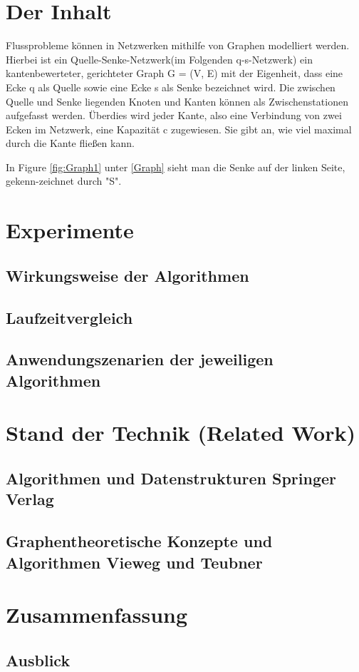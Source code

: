 \documentclass[11pt]{llncs}
\begin{document}
\section{Der Inhalt}
\label{Inhalt}

Flussprobleme k\"onnen in Netzwerken mithilfe von Graphen modelliert werden. Hierbei ist ein Quelle-Senke-Netzwerk(im Folgenden q-s-Netzwerk) ein kantenbewerteter, gerichteter Graph G = (V, E) mit der Eigenheit, dass eine Ecke q als Quelle sowie eine Ecke s als Senke bezeichnet wird. Die zwischen Quelle und Senke liegenden Knoten und Kanten können als Zwischenstationen aufgefasst werden. \"Uberdies wird jeder Kante, also eine Verbindung von zwei Ecken im Netzwerk, eine Kapazität c zugewiesen. Sie gibt an, wie viel maximal durch die Kante fließen kann. \citep{Testref}

In Figure \ref{fig:Graph1} unter \ref{Graph} sieht man die Senke auf der linken Seite, gekenn-zeichnet durch "S". 



\section{Experimente}
\label{Experimente}

\subsection{Wirkungsweise der Algorithmen}

\subsection{Laufzeitvergleich}

\subsection{Anwendungszenarien der jeweiligen Algorithmen}

\section{Stand der Technik (Related Work)}
\label{Related Work}
\subsection{Algorithmen und Datenstrukturen Springer Verlag}
\subsection{Graphentheoretische Konzepte und Algorithmen Vieweg und Teubner}

\section{Zusammenfassung}
\label{Zusammenfassung}
\subsection{Ausblick}




 
\end{document}

